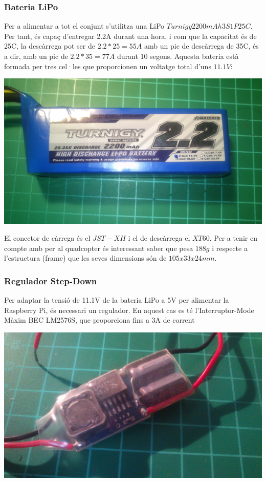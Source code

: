 \documentclass[twoside]{article}
\begin{document}
\subsubsection*{Bateria LiPo}
Per a alimentar a tot el conjunt s'utilitza una LiPo $Turnigy 2200mAh 3S1P 25C$. Per tant, és capaç d'entregar 2.2A durant una hora, i com que la capacitat és de 25C, la descàrrega pot ser de $2.2*25=55A$ amb un pic de descàrrega de 35C, és a dir, amb un pic de $2.2*35=77A$ durant 10 segons. Aquesta bateria està formada per tres cel·les que proporcionen un voltatge total d'uns $11.1V$:\\
\begin{center}
\includegraphics[scale=0.1,viewport=0 400 2560 1250,clip]{images/LiPo.jpg} \\
\end{center}
El conector de càrrega és el $JST-XH$ i el de descàrrega el $XT60$. Per a tenir en compte amb per al quadcopter és interessant saber que pesa $188g$ i respecte a l'estructura (frame) que les seves dimensions són de $105x33x24mm$.

\subsubsection*{Regulador Step-Down}
Per adaptar la tensió de 11.1V de la bateria LiPo a 5V per alimentar la Raspberry Pi, és necessari un regulador. En aquest cas es té l'Interruptor-Mode Màxim BEC LM2576S, que proporciona fins a 3A de corrent \\
\begin{center}
\includegraphics[scale=0.06]{images/Reg_stepdown.jpg}
\end{center}
\end{document}
